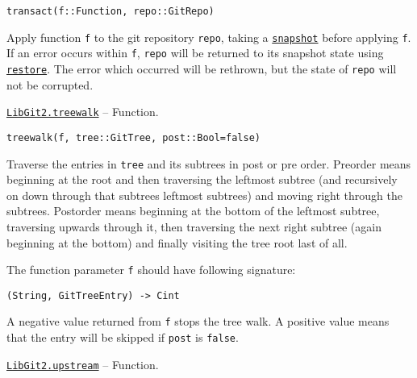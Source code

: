 \begin{adjustwidth}{2em}{0pt}


\begin{verbatim}
transact(f::Function, repo::GitRepo)
\end{verbatim}

Apply function \texttt{f} to the git repository \texttt{repo}, taking a \hyperlink{5664620894068288269}{\texttt{snapshot}} before applying \texttt{f}. If an error occurs within \texttt{f}, \texttt{repo} will be returned to its snapshot state using \hyperlink{1068934750891016732}{\texttt{restore}}. The error which occurred will be rethrown, but the state of \texttt{repo} will not be corrupted.



\end{adjustwidth}
\hypertarget{11991883748960508451}{}
\hyperlink{11991883748960508451}{\texttt{LibGit2.treewalk}}  -- {Function.}

\begin{adjustwidth}{2em}{0pt}


\begin{verbatim}
treewalk(f, tree::GitTree, post::Bool=false)
\end{verbatim}

Traverse the entries in \texttt{tree} and its subtrees in post or pre order. Preorder means beginning at the root and then traversing the leftmost subtree (and recursively on down through that subtree{\textquotesingle}s leftmost subtrees) and moving right through the subtrees. Postorder means beginning at the bottom of the leftmost subtree, traversing upwards through it, then traversing the next right subtree (again beginning at the bottom) and finally visiting the tree root last of all.

The function parameter \texttt{f} should have following signature:


\begin{lstlisting}
(String, GitTreeEntry) -> Cint
\end{lstlisting}

A negative value returned from \texttt{f} stops the tree walk. A positive value means that the entry will be skipped if \texttt{post} is \texttt{false}.



\end{adjustwidth}
\hypertarget{14916286790794253178}{}
\hyperlink{14916286790794253178}{\texttt{LibGit2.upstream}}  -- {Function.}

